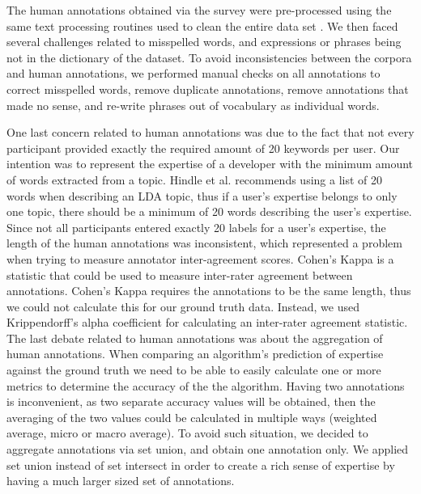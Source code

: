             The human annotations obtained via the survey were pre-processed using the same text processing routines used to clean the entire data set . We then faced several challenges related to misspelled words, and expressions or phrases being not in the dictionary of the dataset. To avoid inconsistencies between the corpora and human annotations, we performed  manual checks on all annotations to correct misspelled words, remove duplicate annotations, remove annotations that made no sense, and re-write phrases out of vocabulary as individual words. 
            
            One last concern related to human annotations was due to the fact that not every participant provided exactly the required amount of 20 keywords per user. Our intention was to represent the expertise of a developer with the minimum amount of words extracted from a topic. Hindle et al. \cite{hindle2012relating} recommends using a list of 20 words when describing an LDA topic, thus if a user's expertise belongs to only one topic, there should be a minimum of 20 words describing the user's expertise. Since not all participants entered exactly 20 labels for a user's expertise, the length of the human annotations was inconsistent, which represented a problem when trying to measure annotator inter-agreement scores. Cohen's Kappa  is a statistic that could be used to measure inter-rater agreement between annotations. Cohen's Kappa requires the annotations to be the same length, thus we could not calculate this for our ground truth data. Instead, we used Krippendorff's alpha coefficient  for calculating an inter-rater agreement statistic. The last debate related to human annotations was about the aggregation of human annotations. When comparing an algorithm's prediction of expertise against the ground truth we need to be able to easily calculate one or more metrics to determine the accuracy of the the algorithm. Having two annotations is inconvenient, as two separate accuracy values will be obtained, then the averaging of the two values could be calculated in multiple ways (weighted average, micro or macro average). To avoid such situation, we decided to aggregate annotations via set union, and obtain one annotation only. We applied set union instead of set intersect in order to create a rich sense of expertise by having a much larger sized set of annotations.
        
